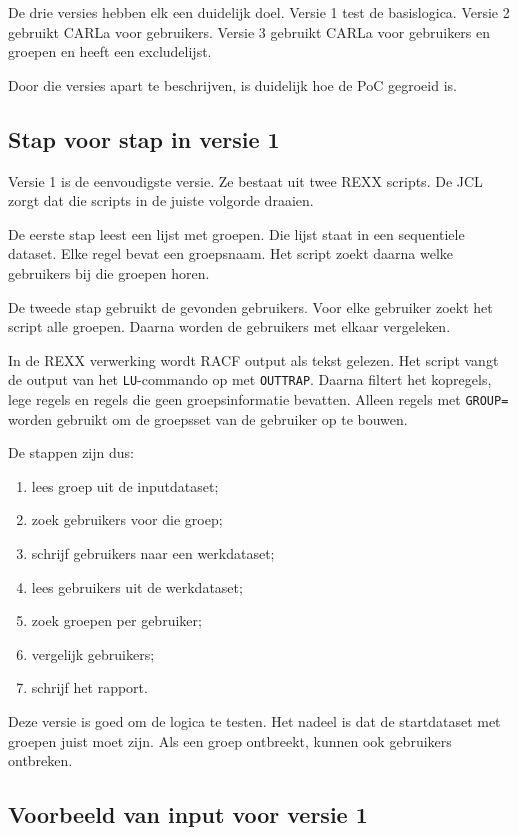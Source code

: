 De drie versies hebben elk een duidelijk doel. Versie 1 test de basislogica. Versie 2 gebruikt CARLa voor gebruikers. Versie 3 gebruikt CARLa voor gebruikers en groepen en heeft een excludelijst.

Door die versies apart te beschrijven, is duidelijk hoe de PoC gegroeid is.

\subsection*{Stap voor stap in versie 1}

Versie 1 is de eenvoudigste versie. Ze bestaat uit twee REXX scripts. De JCL zorgt dat die scripts in de juiste volgorde draaien.

De eerste stap leest een lijst met groepen. Die lijst staat in een sequentiele dataset. Elke regel bevat een groepsnaam. Het script zoekt daarna welke gebruikers bij die groepen horen.

De tweede stap gebruikt de gevonden gebruikers. Voor elke gebruiker zoekt het script alle groepen. Daarna worden de gebruikers met elkaar vergeleken.

In de REXX verwerking wordt RACF output als tekst gelezen. Het script vangt de output van het \texttt{LU}-commando op met \texttt{OUTTRAP}. Daarna filtert het kopregels, lege regels en regels die geen groepsinformatie bevatten. Alleen regels met \texttt{GROUP=} worden gebruikt om de groepsset van de gebruiker op te bouwen.

De stappen zijn dus:

\begin{enumerate}
	\item lees groep uit de inputdataset;
	\item zoek gebruikers voor die groep;
	\item schrijf gebruikers naar een werkdataset;
	\item lees gebruikers uit de werkdataset;
	\item zoek groepen per gebruiker;
	\item vergelijk gebruikers;
	\item schrijf het rapport.
\end{enumerate}

Deze versie is goed om de logica te testen. Het nadeel is dat de startdataset met groepen juist moet zijn. Als een groep ontbreekt, kunnen ook gebruikers ontbreken.

\subsection*{Voorbeeld van input voor versie 1}

